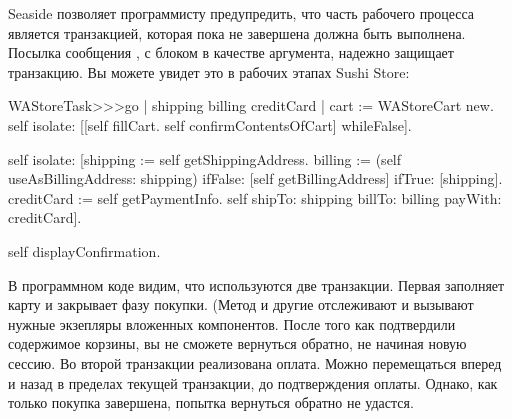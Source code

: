 \documentclass[a4paper,10pt,twoside]{book}
\begin{document}


Seaside позволяет программисту предупредить,
что часть рабочего процесса является транзакцией,
которая пока не завершена должна быть выполнена.
Посылка сообщения ,
с блоком в качестве аргумента, надежно защищает транзакцию.
Вы можете увидет это в рабочих этапах Sushi Store:

\begin{code}{}
WAStoreTask>>>go
	| shipping billing creditCard |
	cart := WAStoreCart new.
	self isolate:
		[[self fillCart.
		self confirmContentsOfCart]
			whileFalse].

	self isolate:
		[shipping := self getShippingAddress.
		billing := (self useAsBillingAddress: shipping)
					ifFalse: [self getBillingAddress]
					ifTrue: [shipping].
		creditCard := self getPaymentInfo.
		self shipTo: shipping billTo: billing payWith: creditCard].

	self displayConfirmation.
\end{code}


В программном коде видим, что используются две транзакции.
Первая заполняет карту и закрывает фазу покупки.
(Метод  и другие отслеживают и вызывают нужные
экзепляры вложенных компонентов.
После того как подтвердили содержимое корзины,
вы не сможете вернуться обратно, не начиная новую сессию.
Во второй транзакции реализована оплата.
Можно перемещаться вперед и назад в пределах текущей транзакции,
до подтверждения оплаты.
Однако, как только покупка завершена, попытка вернуться обратно не удастся.
\end{document}
